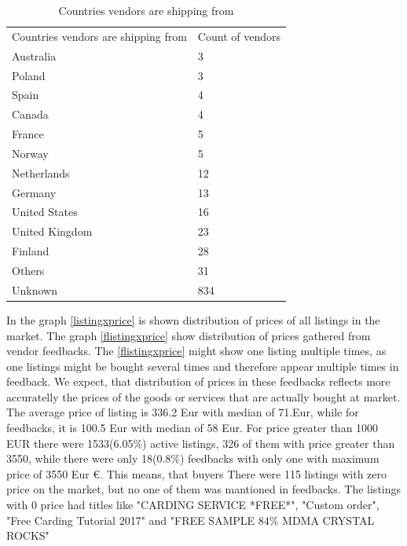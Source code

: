 \documentclass[
  digital, %
  table,   %
  lof,     %
  lot,     %
  oneside
]{fithesis3}
\begin{document}
\begin{table}
    \caption{Countries vendors are shipping from}
    \label{shipcount}
    \begin{tabular}{|l|l|}
    Countries vendors are shipping from  & Count of vendors\\
        Australia                                    & 3   \\ 
        Poland                                       & 3   \\ 
        Spain                                        & 4   \\ 
        Canada                                       & 4   \\ 
        France                                       & 5   \\ 
        Norway                                       & 5   \\ 
        Netherlands                                  & 12  \\ 
        Germany                                      & 13  \\ 
        United States                                & 16  \\ 
        United Kingdom                               & 23  \\ 
        Finland                                      & 28  \\ 
        Others                                       & 31   \\
        Unknown                                      & 834  
    \end{tabular}
\end{table}


In the graph \ref{listingxprice} is shown distribution of prices of all listings in
 the market. 
 The graph \ref{flistingxprice} show distribution of prices gathered
 from vendor feedbacks. The \ref{flistingxprice} might show one listing
 multiple times, as one listings might be bought several times
 and therefore appear multiple times in feedback. We expect, that distribution
 of prices in these feedbacks reflects more accuratelly the prices of the goods or services
 that are actually bought at market.
 The average price of listing is 336.2 Eur with median of 71.Eur,
 while for feedbacks, it is 100.5 Eur with median of 58 Eur.
 For price greater than 1000 EUR there were 1533(6.05\%) active listings,
 326 of them with price greater than 3550, while
  there were only 18(0.8\%) feedbacks with only one with maximum price of 3550 Eur $\euro$.
  This means, that buyers 
 There were 115 listings with zero price on the market,
 but no one of them was mantioned in feedbacks.
 The listings with 0 price had titles like "CARDING SERVICE *FREE*",
 "Custom order", "Free Carding Tutorial 2017" and "FREE SAMPLE 84\% MDMA CRYSTAL ROCKS"
\end{document}
